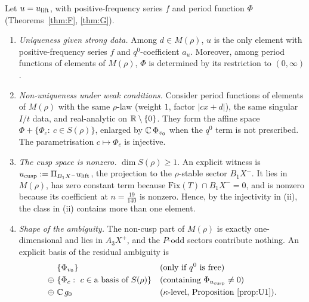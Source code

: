\begin{theorem}\label{thm:uniq9}
Let $u=u_{\rm lift}$, with positive-frequency series $f$ and period function $\Phi$ (Theorems~\ref{thm:F}, \ref{thm:G}).
\begin{enumerate}[label=(\roman*)]
\item \emph{Uniqueness given strong data.} Among $d\in M(\rho)$, $u$ is the only element with positive-frequency series $f$ and $q^0$-coefficient $a_u$. Moreover, among period functions of elements of $M(\rho)$, $\Phi$ is determined by its restriction to $(0,\infty)$.
\item \emph{Non-uniqueness under weak conditions.} Consider period functions of elements of $M(\rho)$ with the same $\rho$-law (weight $1$, factor $|cx+d|$), the same singular $I/t$ data, and real-analytic on $\mathbb{R}\setminus\{0\}$. They form the affine space $\Phi+\{\Phi_c:\ c\in S(\rho)\}$, enlarged by $\mathbb{C}\,\Phi_{v_0}$ when the $q^0$ term is not prescribed. The parametrisation $c\mapsto\Phi_c$ is injective.
\item \emph{The cusp space is nonzero.} $\dim S(\rho)\ge1$. An explicit witness is $u_{\rm cusp}:=\Pi_{B_1X^-}u_{\rm lift}$, the projection to the $\rho$-stable sector $B_1X^-$. It lies in $M(\rho)$, has zero constant term because $\mathrm{Fix}(T)\cap B_1X^-=0$, and is nonzero because its coefficient at $n=\tfrac{19}{140}$ is nonzero. Hence, by the injectivity in (ii), the class in (ii) contains more than one element.
\item \emph{Shape of the ambiguity.} The non-cusp part of $M(\rho)$ is exactly one-dimensional and lies in $A_3X^+$, and the $P$-odd sectors contribute nothing. An explicit basis of the residual ambiguity is
\begin{align*}
&\{\Phi_{v_0}\}&&(\text{only if }q^0\text{ is free})\\
\oplus\ &\{\Phi_c:\ c\in\text{a basis of }S(\rho)\}&&(\text{containing }\Phi_{u_{\rm cusp}}\neq0)\\
\oplus\ &\mathbb{C}\,g_0&&(\kappa\text{-level, Proposition~\ref{prop:U1}}).
\end{align*}
\end{enumerate}
\end{theorem}

